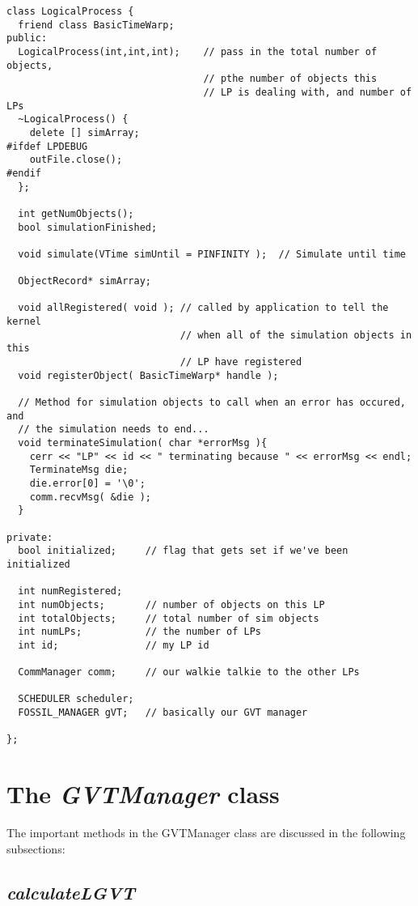 \documentclass[11pt]{report}
\begin{document}
\begin{verbatim}
class LogicalProcess {
  friend class BasicTimeWarp;
public:
  LogicalProcess(int,int,int);    // pass in the total number of objects,
                                  // pthe number of objects this 
                                  // LP is dealing with, and number of LPs
  ~LogicalProcess() {
    delete [] simArray;
#ifdef LPDEBUG
    outFile.close();
#endif
  };

  int getNumObjects();            
  bool simulationFinished;

  void simulate(VTime simUntil = PINFINITY );  // Simulate until time

  ObjectRecord* simArray;
  
  void allRegistered( void ); // called by application to tell the kernel 
                              // when all of the simulation objects in this
                              // LP have registered
  void registerObject( BasicTimeWarp* handle );

  // Method for simulation objects to call when an error has occured, and
  // the simulation needs to end...
  void terminateSimulation( char *errorMsg ){
    cerr << "LP" << id << " terminating because " << errorMsg << endl;
    TerminateMsg die;
    die.error[0] = '\0';
    comm.recvMsg( &die );
  }

private:
  bool initialized;     // flag that gets set if we've been initialized
  
  int numRegistered;
  int numObjects;       // number of objects on this LP
  int totalObjects;     // total number of sim objects
  int numLPs;           // the number of LPs
  int id;               // my LP id

  CommManager comm;     // our walkie talkie to the other LPs

  SCHEDULER scheduler;  
  FOSSIL_MANAGER gVT;   // basically our GVT manager

};
\end{verbatim}

\section{The {\it GVTManager} class}
The important methods in the GVTManager class are discussed in the
following subsections:
\subsection{{\it calculateLGVT}}
\end{document}
